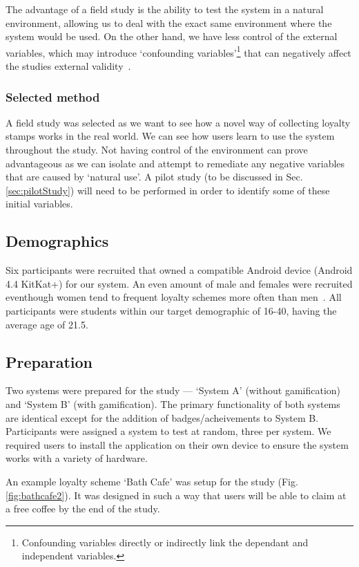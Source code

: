 The advantage of a field study is the ability to test the system in a natural environment, allowing us to deal with the exact same environment where the system would be used. On the other hand, we have less control of the external variables, which may introduce `confounding variables'\footnote{Confounding variables directly or indirectly link the dependant and independent variables.} that can negatively affect the studies external validity~\cite{fieldstudysux}.

\subsubsection{Selected method}
A field study was selected as we want to see how a novel way of collecting loyalty stamps works in the real world. We can see how users learn to use the system throughout the study. Not having control of the environment can prove advantageous as we can isolate and attempt to remediate any negative variables that are caused by `natural use'. A pilot study (to be discussed in Sec. \ref{sec:pilotStudy}) will need to be performed in order to identify some of these initial variables.

\subsection{Demographics}
Six participants were recruited that owned a compatible Android device (Android 4.4 KitKat+) for our system. An even amount of male and females were recruited eventhough women tend to frequent loyalty schemes more often than men~\cite{womenloyalty}. All participants were students within our target demographic of 16-40, having the average age of 21.5.

\subsection{Preparation}
Two systems were prepared for the study --- `System A' (without gamification) and `System B' (with gamification). The primary functionality of both systems are identical except for the addition of badges/acheivements to System B. Participants were assigned a system to test at random, three per system. We required users to install the application on their own device to ensure the system works with a variety of hardware.

An example loyalty scheme `Bath Cafe' was setup for the study (Fig. \ref{fig:bathcafe2}). It was designed in such a way that users will be able to claim at a free coffee by the end of the study.

